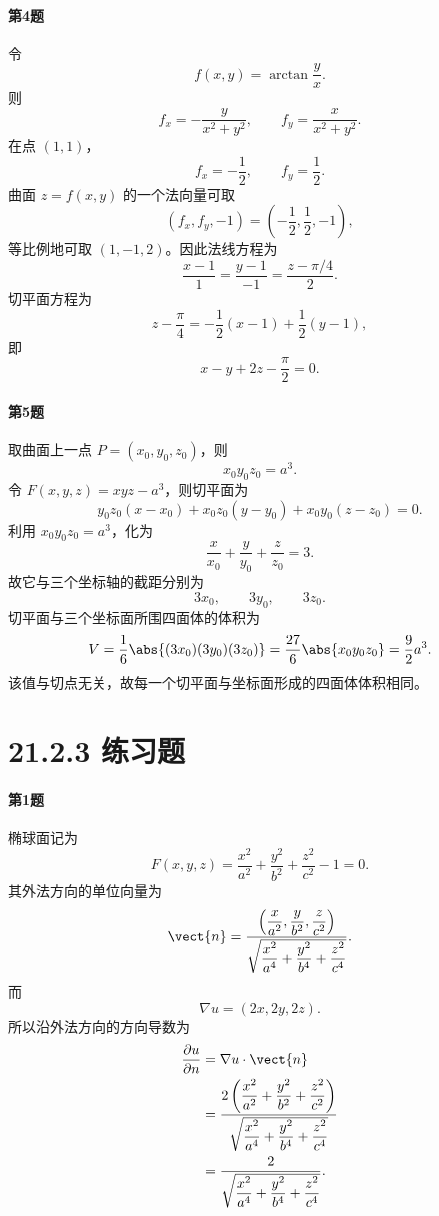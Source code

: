 \paragraph{第4题}
\begin{xsolution}
令
\[
  f(x,y)=\arctan\frac yx.
\]
则
\[
  f_x=-\frac{y}{x^2+y^2},
  \qquad
  f_y=\frac{x}{x^2+y^2}.
\]
在点 $(1,1)$，
\[
  f_x=-\frac12,
  \qquad
  f_y=\frac12.
\]
曲面 $z=f(x,y)$ 的一个法向量可取
\[
  (f_x,f_y,-1)=\left(-\frac12,\frac12,-1\right),
\]
等比例地可取 $(1,-1,2)$。因此法线方程为
\[
  \frac{x-1}{1}=\frac{y-1}{-1}
  =\frac{z-\pi/4}{2}.
\]
切平面方程为
\[
  z-\frac\pi4
  =-\frac12(x-1)+\frac12(y-1),
\]
即
\[
  x-y+2z-\frac\pi2=0.
\]
\end{xsolution}

\paragraph{第5题}
\begin{xsolution}
取曲面上一点 $P=(x_0,y_0,z_0)$，则
\[
  x_0y_0z_0=a^3.
\]
令 $F(x,y,z)=xyz-a^3$，则切平面为
\[
  y_0z_0(x-x_0)+x_0z_0(y-y_0)+x_0y_0(z-z_0)=0.
\]
利用 $x_0y_0z_0=a^3$，化为
\[
  \frac{x}{x_0}+\frac{y}{y_0}+\frac{z}{z_0}=3.
\]
故它与三个坐标轴的截距分别为
\[
  3x_0,\qquad 3y_0,\qquad 3z_0.
\]
切平面与三个坐标面所围四面体的体积为
\[
  V=\frac16\abs{(3x_0)(3y_0)(3z_0)}
  =\frac{27}{6}\abs{x_0y_0z_0}
  =\frac92a^3.
\]
该值与切点无关，故每一个切平面与坐标面形成的四面体体积相同。
\end{xsolution}

\section*{21.2.3 练习题}

\paragraph{第1题}
\begin{xsolution}
椭球面记为
\[
  F(x,y,z)=\frac{x^2}{a^2}+\frac{y^2}{b^2}+\frac{z^2}{c^2}-1=0.
\]
其外法方向的单位向量为
\[
  \vect{n}=
  \frac{\left(\dfrac{x}{a^2},\dfrac{y}{b^2},\dfrac{z}{c^2}\right)}
  {\sqrt{\dfrac{x^2}{a^4}+\dfrac{y^2}{b^4}+\dfrac{z^2}{c^4}}}.
\]
而
\[
  \nabla u=(2x,2y,2z).
\]
所以沿外法方向的方向导数为
\[
\begin{aligned}
  \frac{\partial u}{\partial n}
  &=\nabla u\cdot\vect{n}\\
  &=\frac{2\left(\dfrac{x^2}{a^2}+\dfrac{y^2}{b^2}+\dfrac{z^2}{c^2}\right)}
  {\sqrt{\dfrac{x^2}{a^4}+\dfrac{y^2}{b^4}+\dfrac{z^2}{c^4}}}\\
  &=\frac{2}{\sqrt{\dfrac{x^2}{a^4}+\dfrac{y^2}{b^4}+\dfrac{z^2}{c^4}}}.
\end{aligned}
\]
\end{xsolution}

